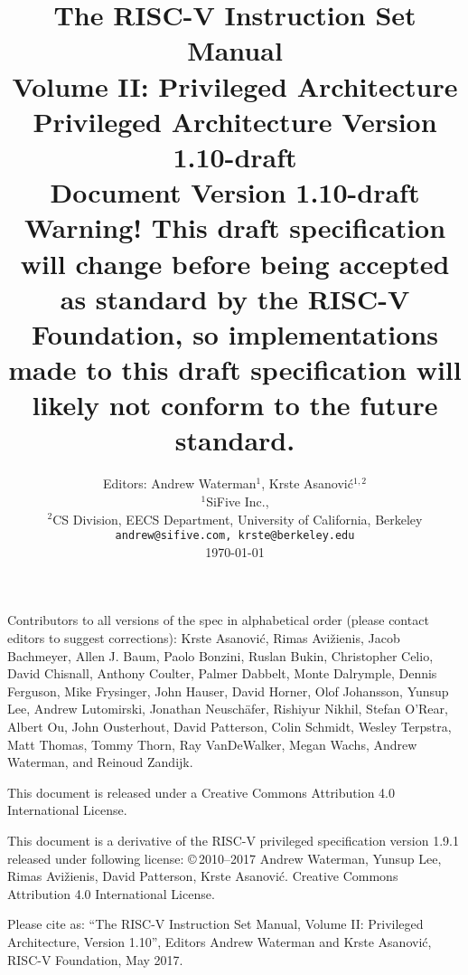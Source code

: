\documentclass[twoside,11pt]{book}
\newcommand{\privrev}{1.10-draft}
\begin{document}
\title{{\vspace{-0.7in}\Large {\bf The RISC-V Instruction Set Manual}} \\
  \large {\bf Volume II: Privileged Architecture} \\
  Privileged Architecture Version \privrev \\
  Document Version \privrev \\
    {\bf Warning! This draft specification
    will change before being accepted as standard by the RISC-V Foundation, so
    implementations made to this draft specification will likely not conform
    to the future standard.}
  \vspace{-0.1in}}

\author{Editors: Andrew Waterman$^{1}$, Krste Asanovi\'{c}$^{1,2}$ \\
  $^{1}$SiFive Inc., \\
  $^{2}$CS Division, EECS Department, University of California, Berkeley \\
  {\tt andrew@sifive.com, krste@berkeley.edu} \\
  \today
}

\date{} 
\maketitle

Contributors to all versions of the spec in alphabetical order (please
contact editors to suggest corrections): Krste Asanovi\'{c}, Rimas
Avi\v{z}ienis, Jacob Bachmeyer, Allen J. Baum, Paolo Bonzini, Ruslan
Bukin, Christopher Celio, David Chisnall, Anthony Coulter, Palmer
Dabbelt, Monte Dalrymple, Dennis Ferguson, Mike Frysinger, John
Hauser, David Horner, Olof Johansson, Yunsup Lee, Andrew Lutomirski,
Jonathan Neusch{\"a}fer, Rishiyur Nikhil, Stefan O'Rear, Albert Ou,
John Ousterhout, David Patterson, Colin Schmidt, Wesley Terpstra, Matt
Thomas, Tommy Thorn, Ray VanDeWalker, Megan Wachs, Andrew Waterman,
and Reinoud Zandijk.

This document is released under a Creative Commons Attribution 4.0
International License.

This document is a derivative of the RISC-V
privileged specification version 1.9.1 released under following license:
\copyright \,2010--2017 Andrew Waterman, Yunsup Lee, Rimas
Avi\v{z}ienis, David Patterson, Krste Asanovi\'{c}. 
Creative Commons Attribution 4.0 International License.

Please cite as: ``The RISC-V Instruction Set
Manual, Volume II: Privileged Architecture, Version 1.10'', Editors
Andrew Waterman and Krste Asanovi\'{c}, RISC-V Foundation, May 2017.
\end{document}
